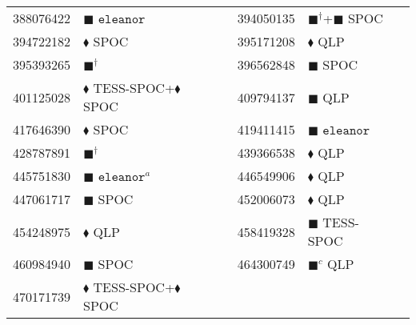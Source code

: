 \begin{longtable}{llrllr}
388076422 & $\blacksquare$ $\texttt{eleanor}$ & \cite{TIC_259172249} & 394050135 & $\blacksquare^\dagger$+$\blacksquare$ SPOC & \cite{TIC_428787891} \\
394722182 & $\blacklozenge$ SPOC & \cite{TIC_70524163} & 395171208 & $\blacklozenge$ QLP & \cite{TIC_409794137} \\
395393265 & $\blacksquare^\dagger$ & \cite{TIC_428787891} & 396562848 & $\blacksquare$ SPOC & \cite{TIC_396562848} \\
401125028 & $\blacklozenge$ TESS-SPOC+$\blacklozenge$ SPOC & \cite{TIC_446549906} & 409794137 & $\blacksquare$ QLP & \cite{TIC_409794137} \\
417646390 & $\blacklozenge$ SPOC & \cite{TIC_70524163} & 419411415 & $\blacksquare$ $\texttt{eleanor}$ & \cite{TIC_419411415} \\
428787891 & $\blacksquare^\dagger$ & \cite{TIC_428787891} & 439366538 & $\blacklozenge$ QLP & \cite{TIC_439366538} \\
445751830 & $\blacksquare$ $\texttt{eleanor}^a$ & \cite{TIC_445751830} & 446549906 & $\blacklozenge$ QLP & \cite{TIC_446549906} \\
447061717 & $\blacksquare$ SPOC & \cite{TIC_447061717} & 452006073 & $\blacklozenge$ QLP & \cite{TIC_439366538} \\
454248975 & $\blacklozenge$ QLP & \cite{TIC_156648452} & 458419328 & $\blacksquare$ TESS-SPOC & \cite{TIC_458419328} \\
460984940 & $\blacksquare$ SPOC & \cite{TIC_460984940} & 464300749 & $\blacksquare^c$ QLP & \cite{TIC_464300749} \\

470171739 & $\blacklozenge$ TESS-SPOC+$\blacklozenge$ SPOC & \cite{TIC_446549906} \\


\end{longtable}
